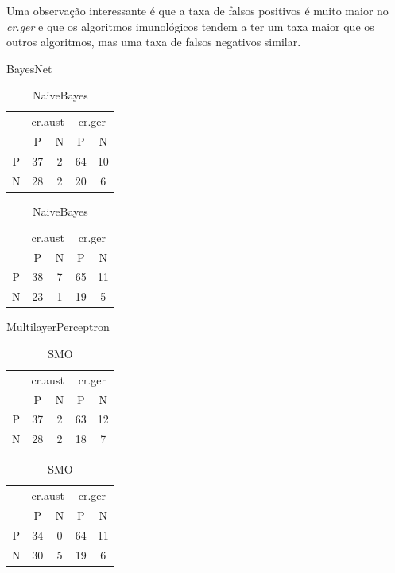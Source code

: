 Uma observação interessante é que a taxa de falsos positivos é muito maior no \emph{cr.ger} e que os algoritmos imunológicos tendem a ter um taxa maior que os outros algoritmos, mas uma taxa de falsos negativos similar.

\begin{table}
    \parbox{.45\linewidth}{
        \centering
        \caption{BayesNet}
        \begin{tabular}{c|c c|c c}
            \multicolumn{1}{c}{}  & \multicolumn{2}{c}{cr.aust} & \multicolumn{2}{c}{cr.ger} \\
            \multirow{1}{2.5mm}{} & P & N & P & N \\
            \hline
            P & 37 & 2 & 64 & 10 \\
            N & 28 & 2 & 20 &  6 \\
        \end{tabular}
    }
    \hfill
    \parbox{.45\linewidth}{
        \centering
        \caption{NaiveBayes}
        \begin{tabular}{c|c c|c c}
            \multicolumn{1}{c}{}  & \multicolumn{2}{c}{cr.aust} & \multicolumn{2}{c}{cr.ger} \\
            \multirow{1}{2.5mm}{} & P & N & P & N \\
            \hline
            P & 38 & 7 & 65 & 11 \\
            N & 23 & 1 & 19 &  5 \\
        \end{tabular}
    }
\end{table}

\begin{table}
    \parbox{.45\linewidth}{
        \centering
        \caption{MultilayerPerceptron}
        \begin{tabular}{c|c c|c c}
            \multicolumn{1}{c}{}  & \multicolumn{2}{c}{cr.aust} & \multicolumn{2}{c}{cr.ger} \\
            \multirow{1}{2.5mm}{} & P & N & P & N \\
            \hline
            P & 37 & 2 & 63 & 12 \\
            N & 28 & 2 & 18 &  7 \\
        \end{tabular}
    }
    \hfill
    \parbox{.45\linewidth}{
        \centering
        \caption{SMO}
        \begin{tabular}{c|c c|c c}
            \multicolumn{1}{c}{}  & \multicolumn{2}{c}{cr.aust} & \multicolumn{2}{c}{cr.ger} \\
            \multirow{1}{2.5mm}{} & P & N & P & N \\
            \hline
            P & 34 & 0 & 64 & 11 \\
            N & 30 & 5 & 19 &  6 \\
        \end{tabular}
    }
\end{table}

